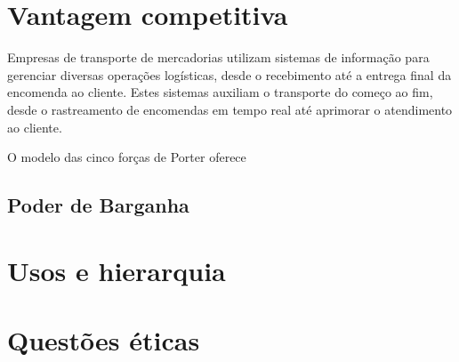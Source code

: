 \documentclass[conference]{IEEEtran}
\begin{document}
\section{Vantagem competitiva}
Empresas de transporte de mercadorias utilizam sistemas de informação para gerenciar diversas operações logísticas, desde o recebimento até a entrega final da encomenda ao cliente. Estes sistemas auxiliam o transporte do começo ao fim, desde o rastreamento de encomendas em tempo real até aprimorar o atendimento ao cliente.


O modelo das cinco forças de Porter oferece 
\subsection{Poder de Barganha} 

\section{Usos e hierarquia}
\section{Questões éticas}
\nocite{*}


\end{document}
